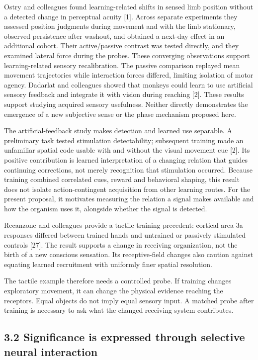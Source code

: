\documentclass[
  american,
  11pt,
  letterpaper,
]{article}
\begin{document}
Ostry and colleagues found learning-related shifts in sensed limb position without a detected change in perceptual acuity {[}1{]}. Across separate experiments they assessed position judgments during movement and with the limb stationary, observed persistence after washout, and obtained a next-day effect in an additional cohort. Their active/passive contrast was tested directly, and they examined lateral force during the probes. These converging observations support learning-related sensory recalibration. The passive comparison replayed mean movement trajectories while interaction forces differed, limiting isolation of motor agency. Dadarlat and colleagues showed that monkeys could learn to use artificial sensory feedback and integrate it with vision during reaching {[}2{]}. These results support studying acquired sensory usefulness. Neither directly demonstrates the emergence of a new subjective sense or the phase mechanism proposed here.

The artificial-feedback study makes detection and learned use separable. A preliminary task tested stimulation detectability; subsequent training made an unfamiliar spatial code usable with and without the visual movement cue {[}2{]}. Its positive contribution is learned interpretation of a changing relation that guides continuing corrections, not merely recognition that stimulation occurred. Because training combined correlated cues, reward and behavioral shaping, this result does not isolate action-contingent acquisition from other learning routes. For the present proposal, it motivates measuring the relation a signal makes available and how the organism uses it, alongside whether the signal is detected.

Recanzone and colleagues provide a tactile-training precedent: cortical area 3a responses differed between trained hands and untrained or passively stimulated controls {[}27{]}. The result supports a change in receiving organization, not the birth of a new conscious sensation. Its receptive-field changes also caution against equating learned recruitment with uniformly finer spatial resolution.

The tactile example therefore needs a controlled probe. If training changes exploratory movement, it can change the physical evidence reaching the receptors. Equal objects do not imply equal sensory input. A matched probe after training is necessary to ask what the changed receiving system contributes.

\subsection{3.2 Significance is expressed through selective neural interaction}\label{significance-is-expressed-through-selective-neural-interaction}
\end{document}
